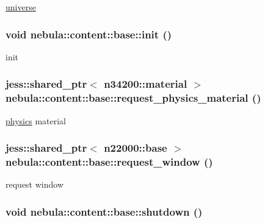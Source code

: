 \hyperlink{namespacenebula_1_1content_1_1universe}{universe} \hypertarget{classnebula_1_1content_1_1base_aca3fd85e0ad782b7d2e1d1a80eef0356}{
\subsubsection[{init}]{\setlength{\rightskip}{0pt plus 5cm}void nebula::content::base::init ()}}
\label{classnebula_1_1content_1_1base_aca3fd85e0ad782b7d2e1d1a80eef0356}


init \hypertarget{classnebula_1_1content_1_1base_a22ac169ce1f01bd3200fa7bbc611ef22}{
\subsubsection[{request\_\-physics\_\-material}]{\setlength{\rightskip}{0pt plus 5cm}jess::shared\_\-ptr$<$ {\bf n34200::material} $>$ nebula::content::base::request\_\-physics\_\-material ()}}
\label{classnebula_1_1content_1_1base_a22ac169ce1f01bd3200fa7bbc611ef22}
\hyperlink{namespacenebula_1_1content_1_1physics}{physics} material \hypertarget{classnebula_1_1content_1_1base_a7f739b80942f64e6d095df52ad1d6d97}{
\subsubsection[{request\_\-window}]{\setlength{\rightskip}{0pt plus 5cm}jess::shared\_\-ptr$<$ {\bf n22000::base} $>$ nebula::content::base::request\_\-window ()}}
\label{classnebula_1_1content_1_1base_a7f739b80942f64e6d095df52ad1d6d97}


request window \hypertarget{classnebula_1_1content_1_1base_a158481f095aa9c6d6cb550b9422e5e51}{
\subsubsection[{shutdown}]{\setlength{\rightskip}{0pt plus 5cm}void nebula::content::base::shutdown ()}}
\label{classnebula_1_1content_1_1base_a158481f095aa9c6d6cb550b9422e5e51}


